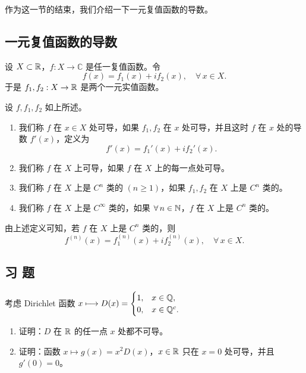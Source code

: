 作为这一节的结束，我们介绍一下一元复值函数的导数。

\subsection{一元复值函数的导数}

设 \(X\subset\mathbb{R}\)，\(f:X\to\mathbb{C}\) 是任一复值函数。令
\[
f(x)=f_1(x)+if_2(x),\quad\forall\,x\in X.
\]
于是 \(f_1,f_2:X\to\mathbb{R}\) 是两个一元实值函数。

\begin{mydef*}{}

	设 \(f,f_1,f_2\) 如上所述。

	\begin{enumerate}[label=\arabic*)]
		\item 我们称 \(f\) 在 \(x\in X\) 处可导，如果 \(f_1,f_2\) 在 \(x\) 处可导，并且这时 \(f\) 在 \(x\) 处的导数 \(f'(x)\)，定义为
		\[
		f'(x)=f_1'(x)+if_2'(x).
		\]

		\item 我们称 \(f\) 在 \(X\) 上可导，如果 \(f\) 在 \(X\) 上的每一点处可导。

		\item 我们称 \(f\) 在 \(X\) 上是 \(C^n\) 类的 \((n\ge1)\)，如果 \(f_1,f_2\) 在 \(X\) 上是 \(C^n\) 类的。

		\item 我们称 \(f\) 在 \(X\) 上是 \(C^\infty\) 类的，如果 \(\forall\,n\in\mathbb{N}\)，\(f\) 在 \(X\) 上是 \(C^n\) 类的。
	\end{enumerate}

\end{mydef*}

由上述定义可知，若 \(f\) 在 \(X\) 上是 \(C^n\) 类的，则
\[
f^{(n)}(x)=f_1^{(n)}(x)+if_2^{(n)}(x),\quad\forall\,x\in X.
\]

\subsection*{习 题}

\begin{exercise}
	\item 考虑 Dirichlet 函数 \(x\longmapsto D(x)=\begin{cases} 1, & x\in\mathbb{Q}, \\ 0, & x\in\mathbb{Q}^c. \end{cases}\)
	\begin{enumerate}[label=\arabic*)]
		\item 证明：\(D\) 在 \(\mathbb{R}\) 的任一点 \(x\) 处都不可导。
		\item 证明：函数 \(x\longmapsto g(x)=x^2D(x)\)，\(x\in\mathbb{R}\) 只在 \(x=0\) 处可导，并且 \(g'(0)=0\)。
	\end{enumerate}
\end{exercise}

